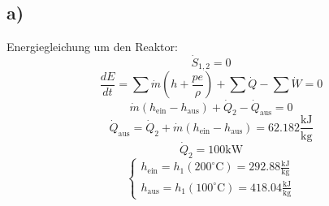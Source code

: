 

\subsection*{a)}
Energiegleichung um den Reaktor:
\[
\dot{S}_{1,2} = 0
\]
\[
\frac{dE}{dt} = \sum \dot{m} (h + \frac{pe}{\rho}) + \sum \dot{Q} - \sum \dot{W} = 0
\]
\[
\dot{m} (h_{\text{ein}} - h_{\text{aus}}) + \dot{Q}_2 - \dot{Q}_{\text{aus}} = 0
\]
\[
\dot{Q}_{\text{aus}} = \dot{Q}_2 + \dot{m} (h_{\text{ein}} - h_{\text{aus}}) = 62.182 \frac{\text{kJ}}{\text{kg}}
\]
\[
\dot{Q}_2 = 100 \text{kW}
\]
\[
\begin{cases}
h_{\text{ein}} = h_1(200^\circ \text{C}) = 292.88 \frac{\text{kJ}}{\text{kg}} \\
h_{\text{aus}} = h_1(100^\circ \text{C}) = 418.04 \frac{\text{kJ}}{\text{kg}}
\end{cases}
\]